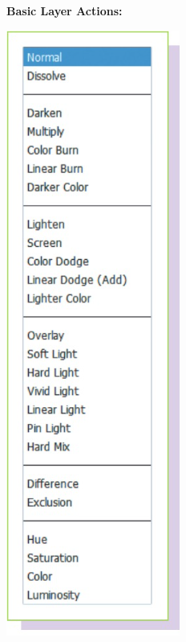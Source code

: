 \documentclass{report}
\begin{document}
    \pagebreak \bigbreak \noindent
    \begin{large}
      \textbf{Basic Layer Actions:}
    \end{large}
    \bigbreak \noindent 
    \begin{center}
      \includegraphics[scale=0.5]{2.png}
    \end{center}
\end{document}
